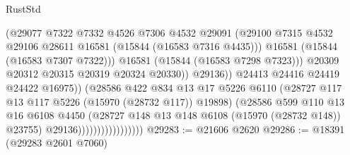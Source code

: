 \begin{lexlean}{RustStd}
\begin{coremodule}
                                                (@29077
                                                  @7322
                                                  @7332
                                                  @4526
                                                  @7306
                                                  @4532
                                                  @29091
                                                  (@29100
                                                    @7315
                                                    @4532
                                                    @29106
                                                    @28611
                                                    @16581
                                                    (@15844 (@16583 @7316 @4435)))
                                                  @16581
                                                  (@15844 (@16583 @7307 @7322)))
                                                @16581
                                                (@15844 (@16583 @7298 @7323)))
                                              @20309
                                              @20312
                                              @20315
                                              @20319
                                              @20324
                                              @20330))
                                          @29136))
                                      @24413
                                      @24416
                                      @24419
                                      @24422
                                      @16975))
                                  (@28586
                                    @422
                                    @834
                                    @13
                                    @17
                                    @5226
                                    @6110
                                    (@28727 @117 @13 @117 @5226 (@15970 (@28732 @117)) @19898)
                                    (@28586
                                      @599
                                      @110
                                      @13
                                      @16
                                      @6108
                                      @4450
                                      (@28727 @148 @13 @148 @6108 (@15970 (@28732 @148)) @23755)
                                      @29136)))))))))))))))))
@29283 := @21606 @2620
@29286 := @18391 (@29283 @2601 @7060)

\end{coremodule}
\end{lexlean}
